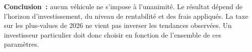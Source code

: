 \documentclass[20pt]{extarticle}
\begin{document}
\vspace{8pt}

\begin{tcolorbox}[highlightbox]
{\Large\bfseries Conclusion~:} \Large aucun v\'ehicule ne s'impose \`a l'unanimit\'e.
Le r\'esultat d\'epend de l'horizon d'investissement, du niveau de
rentabilit\'e et des frais appliqu\'es. La taxe sur les plus-values de
2026 ne vient pas inverser les tendances observ\'ees. Un investisseur
particulier doit donc choisir en fonction de l'ensemble de ces param\`etres.
\end{tcolorbox}
\end{document}
